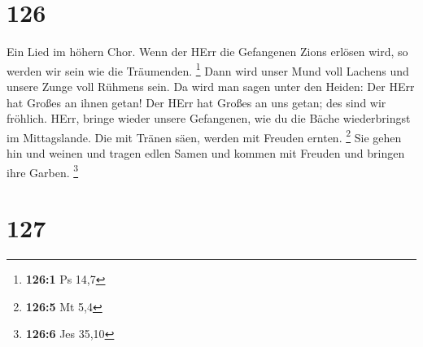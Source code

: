 \hypertarget{section-40}{%
\section{126}\label{section-40}}

 Ein Lied im höhern Chor. Wenn der HErr die Gefangenen Zions
erlösen wird, so werden wir sein wie die Träumenden. \footnote{\textbf{126:1}
  Ps 14,7}  Dann wird unser Mund voll Lachens und unsere
Zunge voll Rühmens sein. Da wird man sagen unter den Heiden: Der HErr
hat Großes an ihnen getan!  Der HErr hat Großes an uns
getan; des sind wir fröhlich.  HErr, bringe wieder unsere
Gefangenen, wie du die Bäche wiederbringst im Mittagslande. 
Die mit Tränen säen, werden mit Freuden ernten. \footnote{\textbf{126:5}
  Mt 5,4}  Sie gehen hin und weinen und tragen edlen Samen
und kommen mit Freuden und bringen ihre Garben. \footnote{\textbf{126:6}
  Jes 35,10}

\hypertarget{section-41}{%
\section{127}\label{section-41}}

